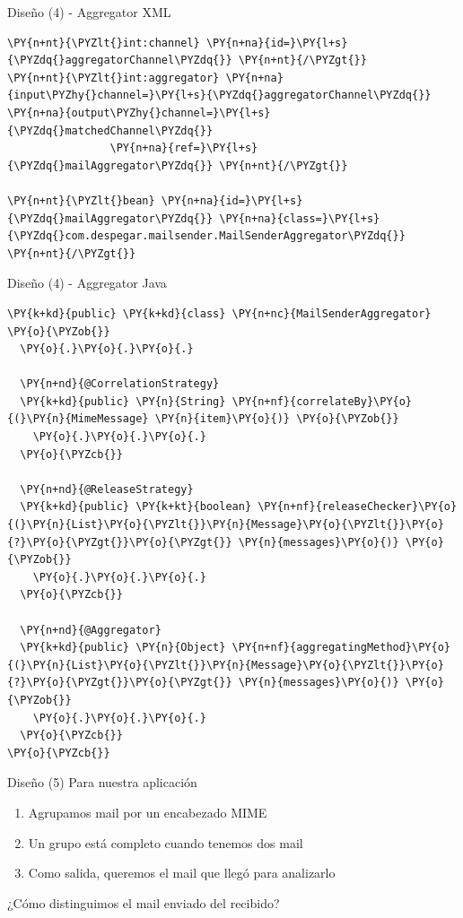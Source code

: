 \documentclass{beamer}
\begin{document}
\begin{frame}[fragile]{Diseño (4) - Aggregator XML}
\begin{Verbatim}[fontsize=\tiny,commandchars=\\\{\}]
\PY{n+nt}{\PYZlt{}int:channel} \PY{n+na}{id=}\PY{l+s}{\PYZdq{}aggregatorChannel\PYZdq{}} \PY{n+nt}{/\PYZgt{}}
\PY{n+nt}{\PYZlt{}int:aggregator} \PY{n+na}{input\PYZhy{}channel=}\PY{l+s}{\PYZdq{}aggregatorChannel\PYZdq{}} \PY{n+na}{output\PYZhy{}channel=}\PY{l+s}{\PYZdq{}matchedChannel\PYZdq{}} 
                \PY{n+na}{ref=}\PY{l+s}{\PYZdq{}mailAggregator\PYZdq{}} \PY{n+nt}{/\PYZgt{}}

\PY{n+nt}{\PYZlt{}bean} \PY{n+na}{id=}\PY{l+s}{\PYZdq{}mailAggregator\PYZdq{}} \PY{n+na}{class=}\PY{l+s}{\PYZdq{}com.despegar.mailsender.MailSenderAggregator\PYZdq{}} \PY{n+nt}{/\PYZgt{}}
\end{Verbatim}
\end{frame}

\begin{frame}[fragile]{Diseño (4) - Aggregator Java}
\begin{Verbatim}[fontsize=\tiny,commandchars=\\\{\}]
\PY{k+kd}{public} \PY{k+kd}{class} \PY{n+nc}{MailSenderAggregator} \PY{o}{\PYZob{}}
  \PY{o}{.}\PY{o}{.}\PY{o}{.}

  \PY{n+nd}{@CorrelationStrategy}
  \PY{k+kd}{public} \PY{n}{String} \PY{n+nf}{correlateBy}\PY{o}{(}\PY{n}{MimeMessage} \PY{n}{item}\PY{o}{)} \PY{o}{\PYZob{}}
    \PY{o}{.}\PY{o}{.}\PY{o}{.}
  \PY{o}{\PYZcb{}}

  \PY{n+nd}{@ReleaseStrategy}
  \PY{k+kd}{public} \PY{k+kt}{boolean} \PY{n+nf}{releaseChecker}\PY{o}{(}\PY{n}{List}\PY{o}{\PYZlt{}}\PY{n}{Message}\PY{o}{\PYZlt{}}\PY{o}{?}\PY{o}{\PYZgt{}}\PY{o}{\PYZgt{}} \PY{n}{messages}\PY{o}{)} \PY{o}{\PYZob{}}
    \PY{o}{.}\PY{o}{.}\PY{o}{.}
  \PY{o}{\PYZcb{}}

  \PY{n+nd}{@Aggregator}
  \PY{k+kd}{public} \PY{n}{Object} \PY{n+nf}{aggregatingMethod}\PY{o}{(}\PY{n}{List}\PY{o}{\PYZlt{}}\PY{n}{Message}\PY{o}{\PYZlt{}}\PY{o}{?}\PY{o}{\PYZgt{}}\PY{o}{\PYZgt{}} \PY{n}{messages}\PY{o}{)} \PY{o}{\PYZob{}}
    \PY{o}{.}\PY{o}{.}\PY{o}{.}
  \PY{o}{\PYZcb{}}
\PY{o}{\PYZcb{}}
\end{Verbatim}
\end{frame}

\begin{frame}{Diseño (5)}
Para nuestra aplicación
\begin{enumerate}[<+->]
\item Agrupamos mail por un encabezado MIME
\item Un grupo está completo cuando tenemos dos mail
\item Como salida, queremos el mail que llegó para analizarlo
\end{enumerate}
\begin{center}
\pause
¿Cómo distinguimos el mail enviado del recibido?
\end{center}
\end{frame}
\end{document}
